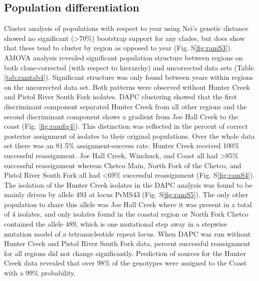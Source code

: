 \documentclass[double,12pt]{beavtex}
\begin{document}
  \subsection{Population
  differentiation}\label{population-differentiation}
  
  Cluster analysis of populations with respect to year using Nei's genetic
  distance showed no significant (\textgreater{}70\%) bootstrap support
  for any clades, but does show that these tend to cluster by region as
  opposed to year (Fig. S\ref{fig:ramS3}). AMOVA analysis revealed
  significant population structure between regions on both clone-corrected
  (with respect to hierarchy) and uncorrected data sets (Table
  \ref{tab:ramtab4}). Significant structure was only found between years
  within regions on the uncorrected data set. Both patterns were observed
  without Hunter Creek and Pistol River South Fork isolates. DAPC
  clustering showed that the first discriminant component separated Hunter
  Creek from all other regions and the second discriminant component shows
  a gradient from Joe Hall Creek to the coast (Fig. \ref{fig:ramfig4}).
  This distinction was reflected in the percent of correct posterior
  assignment of isolates to their original populations. Over the whole
  data set there was an 81.5\% assignment-success rate. Hunter Creek
  received 100\% successful reassignment. Joe Hall Creek, Winchuck, and
  Coast all had \textgreater{}85\% successful reassignment whereas Chetco
  Main, North Fork of the Chetco, and Pistol River South Fork all had
  \textless{}69\% successful reassignment (Fig. S\ref{fig:ramS4}). The
  isolation of the Hunter Creek isolates in the DAPC analysis was found to
  be mainly driven by allele 493 at locus PrMS43 (Fig. S\ref{fig:ramS5}).
  The only other population to share this allele was Joe Hall Creek where
  it was present in a total of 4 isolates, and only isolates found in the
  coastal region or North Fork Chetco contained the allele 489, which is
  one mutational step away in a stepwise mutation model of a
  tetranucleotide repeat locus. When DAPC was run without Hunter Creek and
  Pistol River South Fork data, percent successful reassignment for all
  regions did not change significantly. Prediction of sources for the
  Hunter Creek data revealed that over 98\% of the genotypes were assigned
  to the Coast with a 99\% probability.
  
\end{document}
